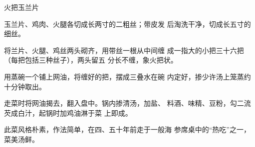 \begin{recipe}{火把玉兰片}

\ingredients



\cooking

\step 	玉兰片、鸡肉、火腿各切成长两寸的二粗丝；带皮发 后淘洗干净，切成长五寸的细丝。

\step 	将兰片、火腿、鸡丝两头砌齐，用带丝一根从中间缠 成一指大的小把三十六把（每把包括三种丝子），两头留五 分长不缠，象火把状。

\step 	用蒸碗一个铺上网油，将缠好的把，摆成三叠水在碗 内定好，掺少许汤上笼蒸约十分钟取出。

\step 	走菜时将网油揭去，翻入盘中。锅内掺清汤，加盐、 料酒、味精、豆粉，勾二流芡成白汁，起锅时加鸡油淋于菜 上即成。

\notes

此菜风格朴素，作法简单，在四、五十年前走于一般海 参席桌中的“热吃”之一，菜美汤鲜。

\end{recipe}

